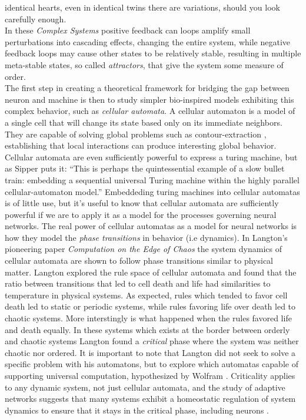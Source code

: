 identical hearts, even in identical twins there are variations, should you look
carefully enough.
%
%
\\
In these \emph{Complex Systems} positive feedback can loops amplify small
perturbations into cascading effects, changing the entire system, while negative
feedback loops may cause other states to be relatively stable, resulting in
multiple meta-stable states, so called \emph{attractors}, that give the system some
measure of order.\\
The first step in creating a theoretical framework for bridging the gap between
neuron and machine is then to study simpler bio-inspired models exhibiting this
complex behavior, such as \emph{cellular automata}.
A cellular automaton is a model of a single cell that will change its state based only on
its immediate neighbors. They are capable of solving global problems such
as contour-extraction \cite{sipper_emergence_1999}, establishing that local interactions can
produce interesting global behavior.\\
Cellular automata are even sufficiently powerful to express a turing machine,
but as Sipper puts it: ``This is perhaps the quintessential example of a slow
bullet train: embedding a sequential universal Turing machine within the
highly parallel cellular-automaton model.''
Embeddeding turing machines into cellular automatas is of little use, but it's
useful to know that cellular automata are sufficiently powerful if we are to
apply it as a model for the processes governing neural networks.
The real power of cellular automatas as a model for neural networks is how they
model the \emph{phase transitions} in behavior (i.e dynamics).
In Langton's pioneering paper \emph{Computation on the Edge of Chaos} \cite{langton_computation_1990} 
the system dynamics of cellular automata are shown to follow phase transitions
similar to physical matter.
Langton explored the rule space of cellular automata and found that the ratio
between transitions that led to cell death and life had similarities to
temperature in physical systems.
As expected, rules which tended to favor cell death led to static or periodic
systems, while rules favoring life over death led to chaotic systems.
More interstingly is what happened when the rules favored life and death
equally.
In these systems which exists at the border between orderly and chaotic systems
Langton found a \emph{critical} phase where the system was neither chaotic nor
ordered.
It is important to note that Langton did not seek to solve a specific problem
with his automatons, but to explore which automatas capable of supporting
universal computation, hypothesized by Wolfram \cite{wolfram_universality_1984}.
Criticality applies to any dynamic system, not just cellular automata, and the
study of adaptive networks \cite{sayama_modeling_2013} suggests that many
systems exhibit a homeostatic regulation of system dynamics to ensure that it
stays in the critical phase, including neurons
\cite{bornholdt_topological_2000}.
